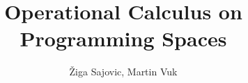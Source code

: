 
\title{Operational Calculus on Programming Spaces}
\author{\v{Z}iga Sajovic, Martin Vuk}



\maketitle









\printbibliography

  
